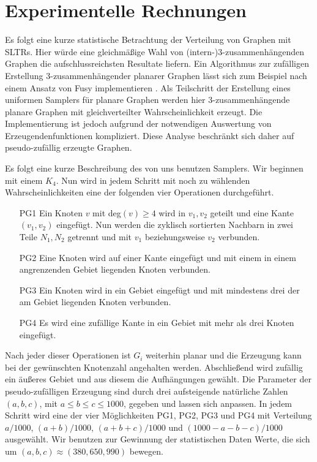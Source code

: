 \section{Experimentelle Rechnungen}\label{stats}

Es folgt eine kurze statistische Betrachtung der Verteilung von Graphen mit SLTRs. Hier würde eine gleichmäßige Wahl von (intern-)3-zusammenhängenden Graphen die aufschlussreichsten Resultate liefern. Ein Algorithmus zur zufälligen Erstellung 3-zusammenhängender planarer Graphen lässt sich zum Beispiel nach einem Ansatz von Fusy implementieren \cite{fusy09}. Als Teilschritt der Erstellung eines uniformen Samplers für planare Graphen werden hier 3-zusammenhängende planare Graphen mit gleichverteilter Wahrscheinlichkeit erzeugt. Die Implementierung ist jedoch aufgrund der notwendigen Auswertung von Erzeugendenfunktionen kompliziert. Diese Analyse beschränkt sich daher auf pseudo-zufällig erzeugte Graphen. 

Es folgt eine kurze Beschreibung des von uns benutzen Samplers. Wir beginnen mit einem $K_4$. Nun wird in jedem Schritt mit noch zu wählenden Wahrscheinlichkeiten eine der folgenden vier Operationen durchgeführt.

\begin{itemize}
\item[PG1] Ein Knoten $v$ mit deg$(v) \geq 4$ wird in $v_1,v_2$ geteilt und eine Kante $(v_1,v_2)$ eingefügt. Nun werden die zyklisch sortierten Nachbarn in zwei Teile $N_1,N_2$ getrennt und mit $v_1$ beziehungsweise $v_2$ verbunden.
\item[PG2] Eine Knoten wird auf einer Kante eingefügt und mit einem in einem angrenzenden Gebiet liegenden Knoten verbunden.
\item[PG3] Ein Knoten wird in ein Gebiet eingefügt und mit mindestens drei der am Gebiet liegenden Knoten verbunden. 
\item[PG4] Es wird eine zufällige Kante in ein Gebiet mit mehr als drei Knoten eingefügt.
\end{itemize}



Nach jeder dieser Operationen ist $G_i$ weiterhin planar und die Erzeugung kann bei der gewünschten Knotenzahl angehalten werden. Abschließend wird zufällig ein äußeres Gebiet und aus diesem die Aufhängungen gewählt. Die Parameter der pseudo-zufälligen Erzeugung sind durch drei aufsteigende natürliche Zahlen $(a,b,c)$, mit $a\leq b\leq c\leq 1000$, gegeben und lassen sich anpassen. In jedem Schritt wird eine der vier Möglichkeiten PG1, PG2, PG3 und PG4 mit Verteilung $a/1000$, $(a+b)/1000$, $(a+b+c)/1000$ und $(1000-a-b-c)/1000$ ausgewählt. Wir benutzen zur Gewinnung der statistischen Daten Werte, die sich um $(a,b,c) \approx (380,650,990)$ bewegen.

